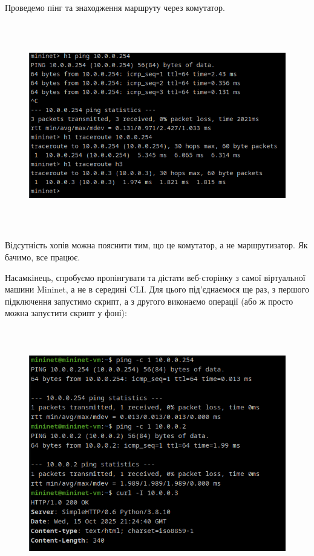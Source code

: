 \documentclass[14pt, a4paper]{extreport}
\begin{document}
	
	Проведемо пінг та знаходження маршруту через комутатор.
	
	\begin{figure}[H]
		\centering
		\includegraphics[height=9cm]{07} 
	\end{figure}
	
	Відсутність хопів можна пояснити тим, що це комутатор, а не маршрутизатор. Як бачимо, все працює.
	
	Насамкінець, спробуємо пропінгувати та дістати веб-сторінку з самої віртуальної машини Mininet, а не в середині CLI. Для цього під'єднаємося ще раз, з першого підключення запустимо скрипт, а з другого виконаємо операції (або ж просто можна запустити скрипт у фоні):
	
	\begin{figure}[H]
		\centering
		\includegraphics[height=11cm]{08} 
	\end{figure}
	
\end{document}
